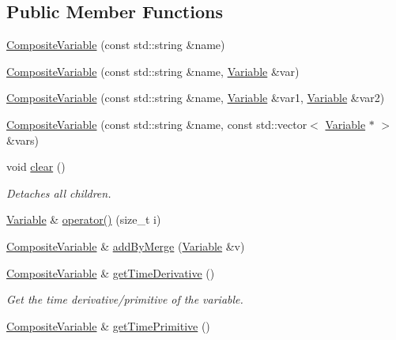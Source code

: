 \subsection*{Public Member Functions}
\begin{DoxyCompactItemize}
\item 
\hyperlink{classocra_1_1CompositeVariable_a1611f9c8b278c183ca68837e0b91f4f0}{Composite\+Variable} (const std\+::string \&name)
\item 
\hyperlink{classocra_1_1CompositeVariable_a131e1ee2f3b4dcd3439b8eb389777f81}{Composite\+Variable} (const std\+::string \&name, \hyperlink{classocra_1_1Variable}{Variable} \&var)
\item 
\hyperlink{classocra_1_1CompositeVariable_a7dce5cb02821d4da44f606a45407e0ae}{Composite\+Variable} (const std\+::string \&name, \hyperlink{classocra_1_1Variable}{Variable} \&var1, \hyperlink{classocra_1_1Variable}{Variable} \&var2)
\item 
\hyperlink{classocra_1_1CompositeVariable_a49deb1e6c3896b39243599019f60ad6b}{Composite\+Variable} (const std\+::string \&name, const std\+::vector$<$ \hyperlink{classocra_1_1Variable}{Variable} $\ast$ $>$ \&vars)
\item 
void \hyperlink{classocra_1_1CompositeVariable_a64e6f462d217b4d3ab3d2b5364373ce8}{clear} ()
\begin{DoxyCompactList}\small\item\em Detaches all children. \end{DoxyCompactList}\item 
\hyperlink{classocra_1_1Variable}{Variable} \& \hyperlink{classocra_1_1CompositeVariable_a6cbd2ebea33e1fd523453b9448b3fde2}{operator()} (size\+\_\+t i)
\item 
\hyperlink{classocra_1_1CompositeVariable}{Composite\+Variable} \& \hyperlink{classocra_1_1CompositeVariable_a9b09f9bf88fd58fcdad695d762c11d13}{add\+By\+Merge} (\hyperlink{classocra_1_1Variable}{Variable} \&v)
\item 
\hyperlink{classocra_1_1CompositeVariable}{Composite\+Variable} \& \hyperlink{classocra_1_1CompositeVariable_ad4c753d254356c1b3686a3da04b0d499}{get\+Time\+Derivative} ()
\begin{DoxyCompactList}\small\item\em Get the time derivative/primitive of the variable. \end{DoxyCompactList}\item 
\hyperlink{classocra_1_1CompositeVariable}{Composite\+Variable} \& \hyperlink{classocra_1_1CompositeVariable_a7870c51e9904734593d7990033a7cca4}{get\+Time\+Primitive} ()

\end{DoxyCompactItemize}
